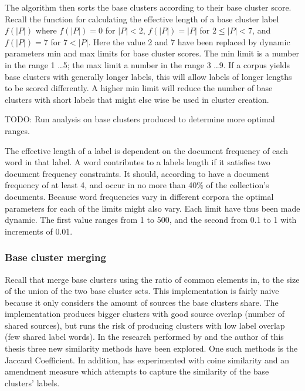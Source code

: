 The algorithm then sorts the base clusters according to their base cluster score. Recall the function for calculating the effective length of a base cluster label \(f(\vert P \vert)\) where \(f(\vert P \vert) = 0\) for \(\vert P \vert < 2\), \(f(\vert P \vert) = \vert P \vert\) for \(2 \le \vert P \vert < 7\), and \(f(\vert P \vert) = 7\) for \(7 < \vert P \vert\). Here the value 2 and 7 have been replaced by dynamic parameters min and max limits for base cluster scores. The min limit is a number in the range 1 \dots 5; the max limit a number in the range 3 \dots 9. If a corpus yields base clusters with generally longer labels, this will allow labels of longer lengths to be scored differently. A higher min limit will reduce the number of base clusters with short labels that might else wise be used in cluster creation.

TODO: Run analysis on base clusters produced to determine more optimal ranges.

The effective length of a label is dependent on the document frequency of each word in that label. A word contributes to a labels length if it satisfies two document frequency constraints. It should, according to \cite{Oren1998} have a document frequency of at least 4, and occur in no more than 40\% of the collection's documents. Because word frequencies vary in different corpora the optimal parameters for each of the limits might also vary. Each limit have thus been made dynamic. The first value ranges from 1 to 500, and the second from 0.1 to 1 with increments of 0.01.

\subsubsection{Base cluster merging}
Recall that \cite{Oren1998} merge base clusters using the ratio of common elements in, to the size of the union of the two base cluster sets. This implementation is fairly naive because it only considers the amount of sources the base clusters share. The implementation produces bigger clusters with good source overlap (number of shared sources), but runs the risk of producing clusters with low label overlap (few shared label words). In the research performed by \supervisor and the author of this thesis three new similarity methods have been explored. One such methods is the Jaccard Coefficient. In addition, \supervisor has experimented with coine similarity and an amendment measure which attempts to capture the similarity of the base clusters' labels.

